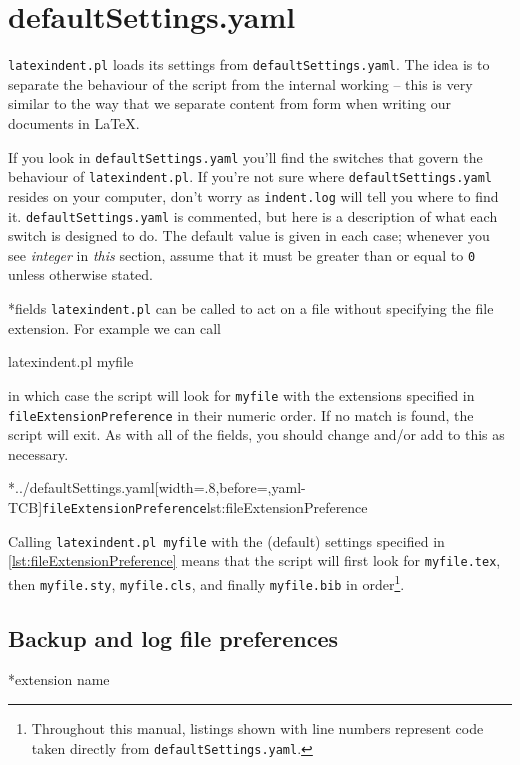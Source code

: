 \section{defaultSettings.yaml}\label{sec:defuseloc}
 \texttt{latexindent.pl} loads its settings from \texttt{defaultSettings.yaml}. The idea is to
 separate the behaviour of the script from the internal working -- this is very similar to
 the way that we separate content from form when writing our documents in \LaTeX.

 If you look in \texttt{defaultSettings.yaml} you'll find the switches that govern the behaviour
 of \texttt{latexindent.pl}. If you're not sure where \texttt{defaultSettings.yaml} resides on
 your computer, don't worry as \texttt{indent.log} will tell you where to find it.
 \texttt{defaultSettings.yaml} is commented, but here is a description of what each switch is
 designed to do. The default value is given in each case; whenever you see
 \emph{integer} in \emph{this} section, assume that it must be
 greater than or equal to \texttt{0} unless otherwise stated.

*{fields}
	\texttt{latexindent.pl} can be called to
	act on a file without specifying the file extension.  For example we can call
	\begin{commandshell}
latexindent.pl myfile
\end{commandshell}
	in which case the script will look for \texttt{myfile} with the extensions
	specified in \texttt{fileExtensionPreference} in their numeric order. If no match is found, the
	script will exit. As with all of the fields, you should change and/or add to this as
	necessary.

	\cmhlistingsfromfile[style=fileExtensionPreference]*{../defaultSettings.yaml}[width=.8\linewidth,before=\centering,yaml-TCB]{\texttt{fileExtensionPreference}}{lst:fileExtensionPreference}

	Calling \texttt{latexindent.pl myfile} with the (default) settings specified in
	\cref{lst:fileExtensionPreference} means that the script will first look for
	\texttt{myfile.tex}, then \texttt{myfile.sty}, \texttt{myfile.cls}, and
	finally \texttt{myfile.bib} in order\footnote{Throughout this manual, listings shown with line numbers represent code
		taken directly from \texttt{defaultSettings.yaml}.}.


\subsection{Backup and log file preferences}
*{extension name}

